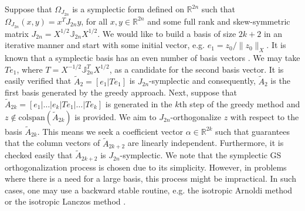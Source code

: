 Suppose that $\Omega_{J_{2n}}$ is a symplectic form defined on $\mathbb R^{2n}$ such that $\Omega_{J_{2n}}(x,y) = x^T J_{2n} y$, for all $x,y\in \mathbb R^{2n}$ and some full rank and skew-symmetric matrix $J_{2n} = X^{1/2} \mathbb J_{2n} X^{1/2}$. We would like to build a basis of size $2k+2$ in an iterative manner and start with some initial vector, e.g. $e_1 = z_0/\| z_0 \|_X$. It is known that a symplectic basis has an even number of basis vectors \cite{Marsden:2010:IMS:1965128}. We may take $Te_1$, where $T = X^{-1/2} \mathbb J_{2n}^{T}X^{1/2}$, as a candidate for the second basis vector. It is easily verified that $\tilde A_2=[e_1|Te_1]$ is $J_{2n}$-symplectic and consequently, $\tilde A_2$ is the first basis generated by the greedy approach. Next, suppose that $\tilde A_{2k} = [e_1|\dots|e_k|Te_1|\dots|Te_k]$ is generated in the $k$th step of the greedy method and $z\not \in \text{colspan}\left(\tilde A_{2k}\right)$ is provided. We aim to $J_{2n}$-orthogonalize $z$ with respect to the basis $\tilde A_{2k}$. This means we seek a coefficient vector $\alpha\in \mathbb R^{2k}$ such that 
 guarantees that the column vectors of $\tilde A_{2k+2}$ are linearly independent. Furthermore, it is checked easily that $\tilde A_{2k+2}$ is $J_{2n}$-symplectic. We note that the symplectic GS orthogonalization process is chosen due to its simplicity. However, in problems where there is a need for a large basis, this process might be impractical. In such cases, one may use a backward stable routine, e.g. the isotropic Arnoldi method or the isotropic Lanczos method \cite{doi:10.1137/S1064827500366434}.

